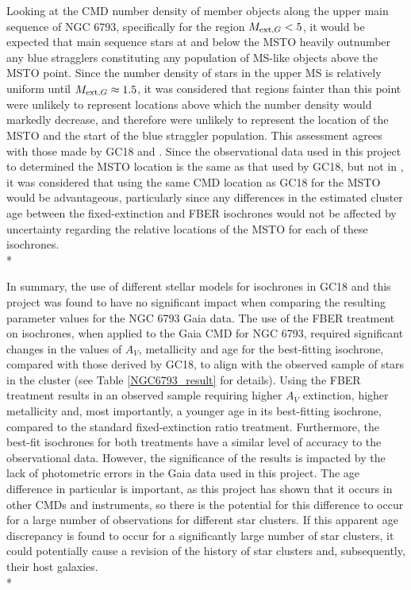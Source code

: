 \documentclass[12pt, a4paper]{report}
\begin{document}
Looking at the CMD number density of member objects along the upper main sequence of NGC 6793, specifically for the region $M_{\textnormal{ext},G} < 5$, it would be expected that main sequence stars at and below the MSTO heavily outnumber any blue stragglers constituting any population of MS-like objects above the MSTO point. Since the number density of stars in the upper MS is relatively uniform until $M_{\textnormal{ext},G} \approx 1.5$, it was considered that regions fainter than this point were unlikely to represent locations above which the number density would markedly decrease, and therefore were unlikely to represent the location of the MSTO and the start of the blue straggler population. This assessment agrees with those made by GC18 and \cite{2019A&A...623A.108B}. Since the observational data used in this project to determined the MSTO location is the same as that used by GC18, but not in \cite{2019A&A...623A.108B}, it was considered that using the same CMD location as GC18 for the MSTO would be advantageous, particularly since any differences in the estimated cluster age between the fixed-extinction and FBER isochrones would not be affected by uncertainty regarding the relative locations of the MSTO for each of these isochrones.\\*

In summary, the use of different stellar models for isochrones in GC18 and this project was found to have no significant impact when comparing the resulting parameter values for the NGC 6793 Gaia data. The use of the FBER treatment on isochrones, when applied to the Gaia CMD for NGC 6793, required significant changes in the values of $A_{V}$, metallicity and age for the best-fitting isochrone, compared with those derived by GC18, to align with the observed sample of stars in the cluster (see Table \ref{NGC6793_result} for details). Using the FBER treatment results in an observed sample requiring higher $A_{V}$ extinction, higher metallicity and, most importantly, a younger age in its best-fitting isochrone, compared to the standard fixed-extinction ratio treatment. Furthermore, the best-fit isochrones for both treatments have a similar level of accuracy to the observational data. However, the significance of the results is impacted by the lack of photometric errors in the Gaia data used in this project. The age difference in particular is important, as this project has shown that it occurs in other CMDs and instruments, so there is the potential for this difference to occur for a large number of observations for different star clusters. If this apparent age discrepancy is found to occur for a significantly large number of star clusters, it could potentially cause a revision of the history of star clusters and, subsequently, their host galaxies. \\*
\end{document}
